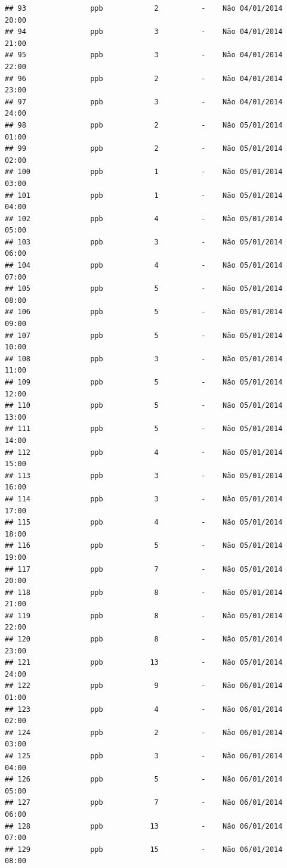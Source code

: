 \documentclass[]{book}
\begin{document}
\begin{verbatim}
## 93               ppb            2          -    Não 04/01/2014 20:00
## 94               ppb            3          -    Não 04/01/2014 21:00
## 95               ppb            3          -    Não 04/01/2014 22:00
## 96               ppb            2          -    Não 04/01/2014 23:00
## 97               ppb            3          -    Não 04/01/2014 24:00
## 98               ppb            2          -    Não 05/01/2014 01:00
## 99               ppb            2          -    Não 05/01/2014 02:00
## 100              ppb            1          -    Não 05/01/2014 03:00
## 101              ppb            1          -    Não 05/01/2014 04:00
## 102              ppb            4          -    Não 05/01/2014 05:00
## 103              ppb            3          -    Não 05/01/2014 06:00
## 104              ppb            4          -    Não 05/01/2014 07:00
## 105              ppb            5          -    Não 05/01/2014 08:00
## 106              ppb            5          -    Não 05/01/2014 09:00
## 107              ppb            5          -    Não 05/01/2014 10:00
## 108              ppb            3          -    Não 05/01/2014 11:00
## 109              ppb            5          -    Não 05/01/2014 12:00
## 110              ppb            5          -    Não 05/01/2014 13:00
## 111              ppb            5          -    Não 05/01/2014 14:00
## 112              ppb            4          -    Não 05/01/2014 15:00
## 113              ppb            3          -    Não 05/01/2014 16:00
## 114              ppb            3          -    Não 05/01/2014 17:00
## 115              ppb            4          -    Não 05/01/2014 18:00
## 116              ppb            5          -    Não 05/01/2014 19:00
## 117              ppb            7          -    Não 05/01/2014 20:00
## 118              ppb            8          -    Não 05/01/2014 21:00
## 119              ppb            8          -    Não 05/01/2014 22:00
## 120              ppb            8          -    Não 05/01/2014 23:00
## 121              ppb           13          -    Não 05/01/2014 24:00
## 122              ppb            9          -    Não 06/01/2014 01:00
## 123              ppb            4          -    Não 06/01/2014 02:00
## 124              ppb            2          -    Não 06/01/2014 03:00
## 125              ppb            3          -    Não 06/01/2014 04:00
## 126              ppb            5          -    Não 06/01/2014 05:00
## 127              ppb            7          -    Não 06/01/2014 06:00
## 128              ppb           13          -    Não 06/01/2014 07:00
## 129              ppb           15          -    Não 06/01/2014 08:00

\end{verbatim}
\end{document}

